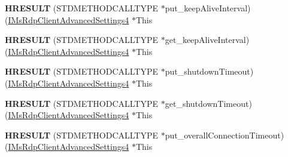 \begin{DoxyCompactItemize}
\mbox{\label{struct_m_s_t_s_c_lib_1_1_i_ms_rdp_client_advanced_settings4_vtbl_a213251a1b3becb5332fa924c164f9f64}} 
{\bfseries H\+R\+E\+S\+U\+LT} (S\+T\+D\+M\+E\+T\+H\+O\+D\+C\+A\+L\+L\+T\+Y\+PE $\ast$put\+\_\+keep\+Alive\+Interval)(\hyperlink{interface_m_s_t_s_c_lib_1_1_i_ms_rdp_client_advanced_settings4}{I\+Ms\+Rdp\+Client\+Advanced\+Settings4} $\ast$This
\item 
\mbox{\label{struct_m_s_t_s_c_lib_1_1_i_ms_rdp_client_advanced_settings4_vtbl_aab0d5c04f957ae3e240bc275c9bbe54e}} 
{\bfseries H\+R\+E\+S\+U\+LT} (S\+T\+D\+M\+E\+T\+H\+O\+D\+C\+A\+L\+L\+T\+Y\+PE $\ast$get\+\_\+keep\+Alive\+Interval)(\hyperlink{interface_m_s_t_s_c_lib_1_1_i_ms_rdp_client_advanced_settings4}{I\+Ms\+Rdp\+Client\+Advanced\+Settings4} $\ast$This
\item 
\mbox{\label{struct_m_s_t_s_c_lib_1_1_i_ms_rdp_client_advanced_settings4_vtbl_a0dc82fecba5be030e7e5ed10eff5b389}} 
{\bfseries H\+R\+E\+S\+U\+LT} (S\+T\+D\+M\+E\+T\+H\+O\+D\+C\+A\+L\+L\+T\+Y\+PE $\ast$put\+\_\+shutdown\+Timeout)(\hyperlink{interface_m_s_t_s_c_lib_1_1_i_ms_rdp_client_advanced_settings4}{I\+Ms\+Rdp\+Client\+Advanced\+Settings4} $\ast$This
\item 
\mbox{\label{struct_m_s_t_s_c_lib_1_1_i_ms_rdp_client_advanced_settings4_vtbl_af9d0f2da1cae74fa1987ba090f04d8bb}} 
{\bfseries H\+R\+E\+S\+U\+LT} (S\+T\+D\+M\+E\+T\+H\+O\+D\+C\+A\+L\+L\+T\+Y\+PE $\ast$get\+\_\+shutdown\+Timeout)(\hyperlink{interface_m_s_t_s_c_lib_1_1_i_ms_rdp_client_advanced_settings4}{I\+Ms\+Rdp\+Client\+Advanced\+Settings4} $\ast$This
\item 
\mbox{\label{struct_m_s_t_s_c_lib_1_1_i_ms_rdp_client_advanced_settings4_vtbl_adeeccd65719ffd0add8b0b7926cc7e95}} 
{\bfseries H\+R\+E\+S\+U\+LT} (S\+T\+D\+M\+E\+T\+H\+O\+D\+C\+A\+L\+L\+T\+Y\+PE $\ast$put\+\_\+overall\+Connection\+Timeout)(\hyperlink{interface_m_s_t_s_c_lib_1_1_i_ms_rdp_client_advanced_settings4}{I\+Ms\+Rdp\+Client\+Advanced\+Settings4} $\ast$This
\item 
\mbox{\label{struct_m_s_t_s_c_lib_1_1_i_ms_rdp_client_advanced_settings4_vtbl_ab7d8dc9f391b3008e37ddabf65a36472}} 

\end{DoxyCompactItemize}
